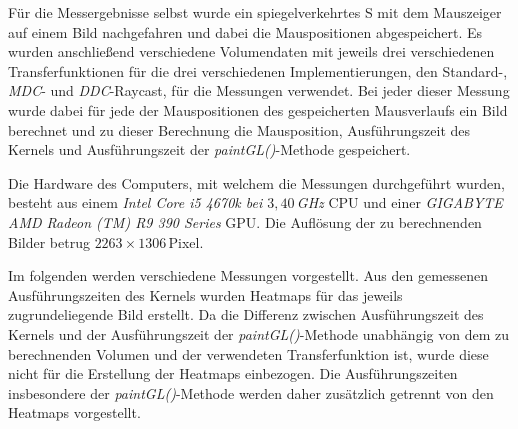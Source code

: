 Für die Messergebnisse selbst wurde ein spiegelverkehrtes S mit dem Mauszeiger auf einem Bild nachgefahren und dabei die Mauspositionen abgespeichert.
Es wurden anschließend verschiedene Volumendaten mit jeweils drei verschiedenen Transferfunktionen für die drei verschiedenen Implementierungen, den Standard-, \emph{MDC}- und \emph{DDC}-Raycast, für die Messungen verwendet.
Bei jeder dieser Messung wurde dabei für jede der Mauspositionen des gespeicherten Mausverlaufs ein Bild berechnet und zu dieser Berechnung die Mausposition, Ausführungszeit des Kernels und Ausführungszeit der \emph{paintGL()}-Methode gespeichert.

Die Hardware des Computers, mit welchem die Messungen durchgeführt wurden, besteht aus einem \emph{Intel Core i5 4670k bei $3,40$\,GHz} CPU und einer \emph{GIGABYTE AMD Radeon (TM) R9 390 Series} GPU.
Die Auflösung der zu berechnenden Bilder betrug $2263\times1306$\,Pixel.

Im folgenden werden verschiedene Messungen vorgestellt.
Aus den gemessenen Ausführungszeiten des Kernels wurden Heatmaps für das jeweils zugrundeliegende Bild erstellt.
Da die Differenz zwischen Ausführungszeit des Kernels und der Ausführungszeit der \emph{paintGL()}-Methode unabhängig von dem zu berechnenden Volumen und der verwendeten Transferfunktion ist, wurde diese nicht für die Erstellung der Heatmaps einbezogen.
Die Ausführungszeiten insbesondere der \emph{paintGL()}-Methode werden daher zusätzlich getrennt von den Heatmaps vorgestellt.



